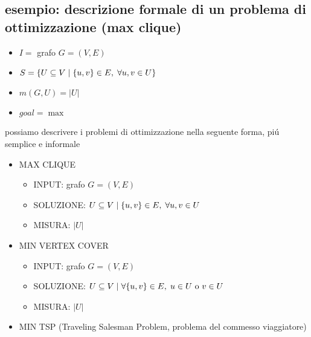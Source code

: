 
\subsection*{esempio: descrizione formale di un problema di ottimizzazione (max clique)}
\begin{flushleft}
	\begin{itemize}
		\item $I=$ grafo $G=(V,E)$
		\item $S= \{U\subseteq V\hspace{0.1cm}\vert\hspace{0.1cm}\{u,v\}\in E,\hspace{0.1cm}\forall u,v\in U\}$
		\item $m(G,U)=|U|$
		\item $goal=\max$
	\end{itemize}
	\vspace{0.5cm}
	possiamo descrivere i problemi di ottimizzazione nella seguente forma, pi\'u semplice e informale
	\begin{itemize}
		\item MAX CLIQUE
		\begin{itemize}
			\item INPUT: grafo $G=(V,E)$
			\item SOLUZIONE: $U\subseteq V\hspace{0.1cm}\vert\hspace{0.1cm}\{u,v\}\in E,\hspace{0.1cm}\forall u,v\in U$
			\item MISURA: $|U|$
		\end{itemize}
		\item MIN VERTEX COVER
		\begin{itemize}
			\item INPUT: grafo $G=(V,E)$
			\item SOLUZIONE: $U\subseteq V\hspace{0.1cm}\vert\hspace{0.1cm}\forall\{u,v\}\in E,\hspace{0.1cm}u\in U\text{ o }v\in U$
			\item MISURA: $|U|$
		\end{itemize}
		\item MIN TSP (Traveling Salesman Problem, problema del commesso viaggiatore)

\end{itemize}
\end{flushleft}
